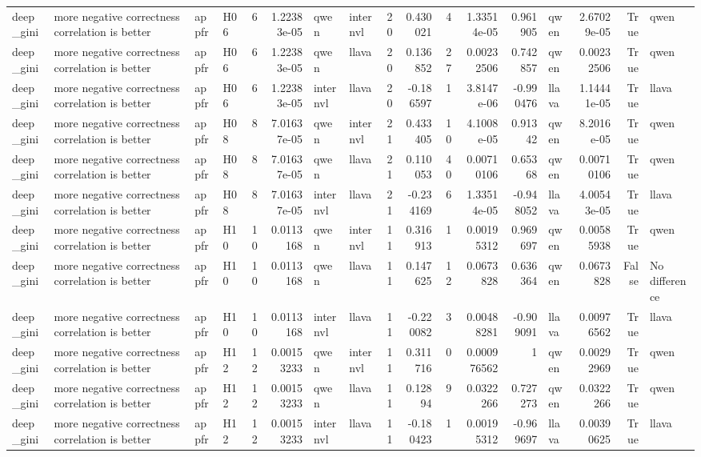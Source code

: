 \begin{longtable}{llllrrllrrrrrlrrl}
deep\_gini & more negative correctness correlation is better & appfr & H06 & 6 & 1.22383e-05 & qwen & internvl & 20 & 0.430021 & 4 & 1.33514e-05 & 0.961905 & qwen & 2.67029e-05 & True & qwen \\
deep\_gini & more negative correctness correlation is better & appfr & H06 & 6 & 1.22383e-05 & qwen & llava & 20 & 0.136852 & 27 & 0.00232506 & 0.742857 & qwen & 0.00232506 & True & qwen \\
deep\_gini & more negative correctness correlation is better & appfr & H06 & 6 & 1.22383e-05 & internvl & llava & 20 & -0.186597 & 1 & 3.8147e-06 & -0.990476 & llava & 1.14441e-05 & True & llava \\
deep\_gini & more negative correctness correlation is better & appfr & H08 & 8 & 7.01637e-05 & qwen & internvl & 21 & 0.433405 & 10 & 4.1008e-05 & 0.91342 & qwen & 8.2016e-05 & True & qwen \\
deep\_gini & more negative correctness correlation is better & appfr & H08 & 8 & 7.01637e-05 & qwen & llava & 21 & 0.110053 & 40 & 0.00710106 & 0.65368 & qwen & 0.00710106 & True & qwen \\
deep\_gini & more negative correctness correlation is better & appfr & H08 & 8 & 7.01637e-05 & internvl & llava & 21 & -0.234169 & 6 & 1.33514e-05 & -0.948052 & llava & 4.00543e-05 & True & llava \\
deep\_gini & more negative correctness correlation is better & appfr & H10 & 10 & 0.0113168 & qwen & internvl & 11 & 0.316913 & 1 & 0.00195312 & 0.969697 & qwen & 0.00585938 & True & qwen \\
deep\_gini & more negative correctness correlation is better & appfr & H10 & 10 & 0.0113168 & qwen & llava & 11 & 0.147625 & 12 & 0.0673828 & 0.636364 & qwen & 0.0673828 & False & No difference \\
deep\_gini & more negative correctness correlation is better & appfr & H10 & 10 & 0.0113168 & internvl & llava & 11 & -0.220082 & 3 & 0.00488281 & -0.909091 & llava & 0.00976562 & True & llava \\
deep\_gini & more negative correctness correlation is better & appfr & H12 & 12 & 0.00153233 & qwen & internvl & 11 & 0.311716 & 0 & 0.000976562 & 1 & qwen & 0.00292969 & True & qwen \\
deep\_gini & more negative correctness correlation is better & appfr & H12 & 12 & 0.00153233 & qwen & llava & 11 & 0.12894 & 9 & 0.0322266 & 0.727273 & qwen & 0.0322266 & True & qwen \\
deep\_gini & more negative correctness correlation is better & appfr & H12 & 12 & 0.00153233 & internvl & llava & 11 & -0.180423 & 1 & 0.00195312 & -0.969697 & llava & 0.00390625 & True & llava \\

\end{longtable}
